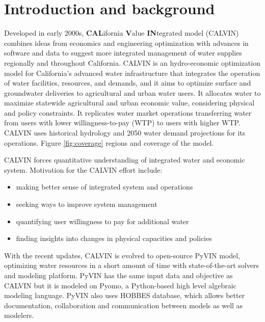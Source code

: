 \documentclass[12pt]{article}%
\begin{document}
\section{Introduction and background}
%
Developed in early 2000s, {\bf CAL}ifornia {\bf V}alue {\bf IN}tegrated model (CALVIN) combines ideas from economics and engineering optimization with advances in software and data to suggest more integrated management of water supplies regionally and throughout California. CALVIN is an hydro-economic optimization model for California's advanced water infrastructure that integrates the operation of water facilities, resources, and demands, and it aims to optimize surface and groundwater deliveries to agricultural and urban water users. It allocates water to maximize statewide agricultural and urban economic value, considering physical and policy constraints. It replicates water market operations transferring water from users with lower willingness-to-pay (WTP) to users with higher WTP. CALVIN uses historical hydrology and 2050 water demand projections for its operations. Figure \ref{fig:coverage} regions and coverage of the model. \\
\par CALVIN forces quantitative understanding of integrated water and economic system. Motivation for the CALVIN effort include:
\begin{itemize}
	\item making better sense of integrated system and operations
	\item seeking ways to improve system management
	\item quantifying user willingness to pay for additional water
	\item finding insights into changes in physical capacities and policies
\end{itemize}
%
\par With the recent updates, CALVIN is evolved to open-source PyVIN model, optimizing water resources in a short amount of time with state-of-the-art solvers and modeling platform. PyVIN has the same input data and objective as CALVIN but it is modeled on Pyomo, a Python-based high level algebraic modeling language. PyVIN also uses HOBBES database, which allows better documentation, collaboration and communication between models as well as modelers.
%
\end{document}
